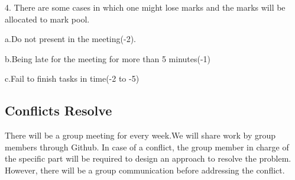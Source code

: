 \documentclass[12pt]{amsart}
\begin{document}
4. There are some cases in which one might lose marks and the marks will be allocated to mark pool.

\quad
a.Do not present in the meeting(-2).

\quad
b.Being late for the meeting for more than 5 minutes(-1)
 
\quad
c.Fail to finish tasks in time(-2 to -5)

\subsection{\textbf{Conflicts Resolve}}
There will be a group meeting for every week.We will share work by group members through Github. In case of a conflict, the group member in charge of the specific part will be required to design an approach to resolve the problem. However, there will be a group communication before addressing the conflict.
\end{document}
